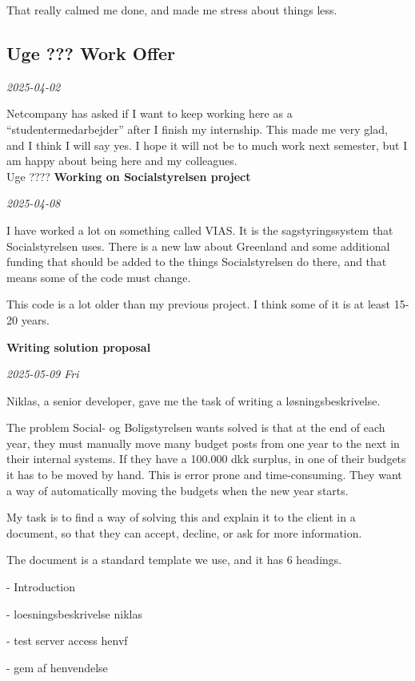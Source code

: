 \documentclass[../main.tex]{subfiles}
\begin{document}
That really calmed me done, and made me stress about things less. \\

\subsection{Uge ??? \textbf{Work Offer}}

\textit{2025-04-02}

Netcompany has asked if I want to keep working here as a
``studentermedarbejder'' after I finish my internship. This made me very
glad, and I think I will say yes. I hope it will not be to much work
next semester, but I am happy about being here and my colleagues. \\

Uge ???? \textbf{Working on Socialstyrelsen project}

\textit{2025-04-08}

I have worked a lot on something called VIAS. It is the sagstyringssystem that Socialstyrelsen uses. There is a new law about Greenland and some additional funding that should be added to the things Socialstyrelsen do there, and that means some of the code must change.

This code is a lot older than my previous project. I think some of it is at least 15-20 years. 

\textbf{Writing solution proposal}

\textit{2025-05-09 Fri}

Niklas, a senior developer, gave me the task of writing a løsningsbeskrivelse.

The problem Social- og Boligstyrelsen wants solved is that at the end of each year, they must manually move many budget posts from one year to the next in their internal systems. If they have a 100.000 dkk surplus, in one of their budgets it has to be moved by hand.
This is error prone and time-consuming. They want a way of automatically moving the budgets when the new year starts.

My task is to find a way of solving this and explain it to the client in a document, so that they can accept, decline, or ask for more information.

The document is a standard template we use, and it has 6 headings.

- Introduction

- loesningsbeskrivelse niklas

- test server access henvf

- gem af henvendelse
\end{document}

